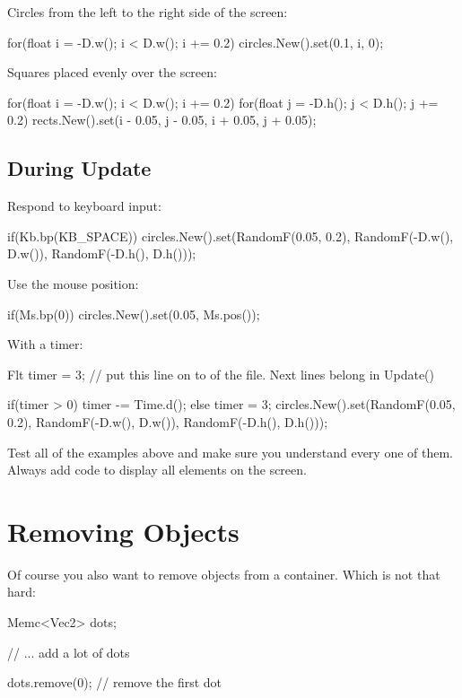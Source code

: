Circles from the left to the right side of the screen:

\begin{code}
for(float i = -D.w(); i < D.w(); i += 0.2) {
  circles.New().set(0.1, i, 0);
}
\end{code}

Squares placed evenly over the screen:
\begin{code}
for(float i = -D.w(); i < D.w(); i += 0.2)
{
	for(float j = -D.h();  j < D.h();  j += 0.2)
	{
		 rects.New().set(i - 0.05, j - 0.05, i + 0.05, j + 0.05);
	}     
}
\end{code}

\subsection{During Update}

Respond to keyboard input:
\begin{code}
if(Kb.bp(KB_SPACE)) {
  circles.New().set(RandomF(0.05, 0.2), RandomF(-D.w(), D.w()), RandomF(-D.h(), D.h()));
}
\end{code}

Use the mouse position:
\begin{code}
if(Ms.bp(0)) {
  circles.New().set(0.05, Ms.pos());
}
\end{code}

With a timer:
\begin{code}
Flt timer = 3; // put this line on to of the file. Next lines belong in Update()

if(timer > 0) timer -= Time.d();
else {
  timer = 3;
	circles.New().set(RandomF(0.05, 0.2), RandomF(-D.w(), D.w()), RandomF(-D.h(), D.h()));
}
\end{code}

\begin{exercise}
Test all of the examples above and make sure you understand every one of them. Always add code to display all elements on the screen.
\end{exercise}

\section{Removing Objects}
Of course you also want to remove objects from a container. Which is not that hard:

\begin{code}
Memc<Vec2> dots;

// ... add a lot of dots

dots.remove(0); // remove the first dot
\end{code}

